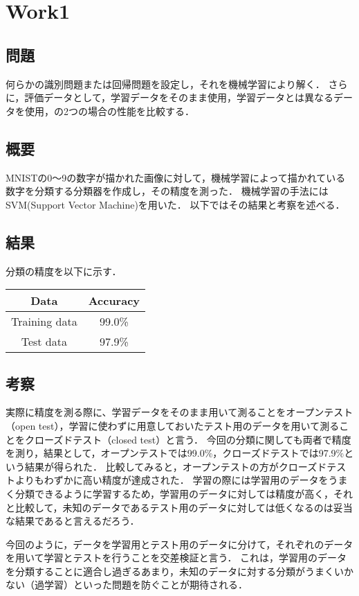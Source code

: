 \section{Work1}
\subsection*{問題}
何らかの識別問題または回帰問題を設定し，それを機械学習により解く．
さらに，評価データとして，学習データをそのまま使用，学習データとは異なるデータを使用，の2つの場合の性能を比較する．

\subsection{概要}
MNISTの0～9の数字が描かれた画像に対して，機械学習によって描かれている数字を分類する分類器を作成し，その精度を測った．
機械学習の手法にはSVM(Support Vector Machine)を用いた．
以下ではその結果と考察を述べる．

\subsection{結果}
分類の精度を以下に示す．
\begin{table}[H]
    \begin{center}
        \begin{tabular}{cc}
            \hline
            Data & Accuracy\\
            \hline \hline
            Training data & 99.0\%\\
            Test data & 97.9\%\\
            \hline
        \end{tabular}
    \end{center}
\end{table}

\subsection{考察}
実際に精度を測る際に、学習データをそのまま用いて測ることをオープンテスト（open test），学習に使わずに用意しておいたテスト用のデータを用いて測ることをクローズドテスト（closed test）と言う．
今回の分類に関しても両者で精度を測り，結果として，オープンテストでは99.0\%，クローズドテストでは97.9\%という結果が得られた．
比較してみると，オープンテストの方がクローズドテストよりもわずかに高い精度が達成された．
学習の際には学習用のデータをうまく分類できるように学習するため，学習用のデータに対しては精度が高く，それと比較して，未知のデータであるテスト用のデータに対しては低くなるのは妥当な結果であると言えるだろう．\par
今回のように，データを学習用とテスト用のデータに分けて，それぞれのデータを用いて学習とテストを行うことを交差検証と言う．
これは，学習用のデータを分類することに適合し過ぎるあまり，未知のデータに対する分類がうまくいかない（過学習）といった問題を防ぐことが期待される．
